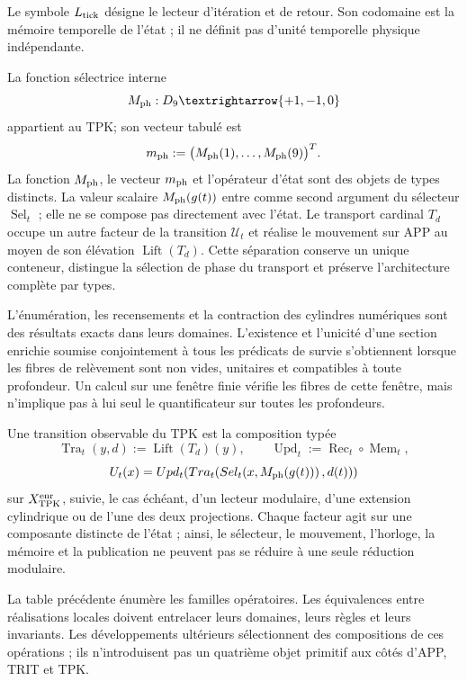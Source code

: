 Le symbole \(L_{\rm tick}\) désigne le lecteur d'itération et de retour. Son
codomaine est la mémoire temporelle de l'état ; il ne définit pas d'unité temporelle
physique indépendante.

La fonction sélectrice interne
\[
 M_{\rm ph}:\mathcal D_9\longrightarrow\{+1,-1,0\}
\]
appartient au TPK\@ ; son vecteur tabulé est
\[
 m_{\rm ph}:=\bigl(M_{\rm ph}(1),\ldots,M_{\rm ph}(9)\bigr)^{\mathsf T}.
\]
La fonction \(M_{\rm ph}\), le vecteur \(m_{\rm ph}\) et l'opérateur d'état
sont des objets de types distincts. La valeur scalaire \(M_{\rm ph}(g(t))\) entre
comme second argument du sélecteur \(\operatorname{Sel}_t\) ; elle ne se compose pas
directement avec l'état. Le transport cardinal \(T_d\) occupe un autre facteur
de la transition \(\mathcal U_t\) et réalise le mouvement sur APP au moyen de
son élévation \(\operatorname{Lift}(T_d)\). Cette séparation conserve un unique
conteneur, distingue la sélection de phase du transport et préserve
l'architecture complète par types.

\begin{resultbox}[title={Profondeur finie et limite enrichie}]
L'énumération, les recensements et la contraction des cylindres numériques sont des
résultats exacts dans leurs domaines. L'existence et l'unicité d'une section
enrichie soumise conjointement à tous les prédicats de survie
s'obtiennent lorsque les fibres de relèvement sont non vides, unitaires et
compatibles à toute profondeur. Un calcul sur une fenêtre finie
vérifie les fibres de cette fenêtre, mais n'implique pas à lui seul le
quantificateur sur toutes les profondeurs.
\end{resultbox}

\begin{theorem}
\label{thm:composicion-dinamica-tpk-rev11}
Une transition observable du TPK est la composition typée
\[
 \operatorname{Tra}_t(y,d):=\operatorname{Lift}(T_d)(y),
 \qquad
 \operatorname{Upd}_t:=\operatorname{Rec}_t\circ\operatorname{Mem}_t,
\]
\[
 \mathcal U_t(x)
 =\operatorname{Upd}_t\!\left(
  \operatorname{Tra}_t\!\left(
   \operatorname{Sel}_t\!\left(x,M_{\rm ph}(g(t))\right),d(t)
  \right)\right)
\]
sur \(\mathcal X_{\rm TPK}^{\rm enr}\), suivie, le cas échéant, d'un
lecteur modulaire, d'une extension cylindrique ou de l'une des deux projections.
Chaque facteur agit sur une composante distincte de l'état ; ainsi, le
sélecteur, le mouvement, l'horloge, la mémoire et la publication ne peuvent pas
se réduire à une seule réduction modulaire.
\end{theorem}

La table précédente énumère les familles opératoires. Les équivalences entre
réalisations locales doivent entrelacer leurs domaines, leurs règles et leurs invariants.
Les développements ultérieurs sélectionnent des compositions de ces opérations ;
ils n'introduisent pas un quatrième objet primitif aux côtés d'APP, TRIT et TPK.
